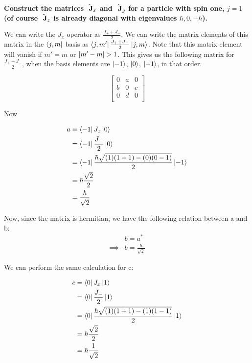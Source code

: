 \question


\begin{alphaparts}
    
\questionpart
\textbf{Construct the matrices $\hat{\textbf{~J}}_x$ and $\hat{\textbf{~J}}_y$ for a particle with 
spin one, $j = 1$ (of course $\hat{\textbf{~J}}_z$ is already diagonal with eigenvalues $\hbar, 0, -\hbar$).} 

We can write the $J_x$ operator as $\frac{J_+ + J_-}{2}$. We can write the matrix elements of this matrix in the $\bra{j,m}$ basis as $\bra{j,m'} \frac{J_+ + J_-}{2} \ket{j,m}$. Note that this matrix element will vanish if $m' = m$ or $\abs{m' - m} > 1$. This gives us the following matrix for $\frac{J_+ + J_-}{2}$, when the basis elements are $\ket{-1}$, $\ket{0}$, $\ket{+1}$, in that order.

\begin{equation}
    \begin{bmatrix}
    0 & a & 0 \\
    b & 0 & c \\
    0 & d & 0 \\
    \end{bmatrix}
\end{equation}

Now

\begin{equation}
    \begin{split}
        a &= \bra{-1} J_x \ket{0} \\
        &= \bra{-1} \frac{J_-}{2} \ket{0} \\ 
        &= \bra{-1} \frac{\hbar \sqrt{(1)(1+1) - (0)(0 - 1)}}{2} \ket{-1}\\
        &= \hbar \frac{\sqrt{2}}{2} \\
        &= \frac{\hbar}{\sqrt{2}}
    \end{split}
\end{equation}

Now, since the matrix is hermitian, we have the following relation between a and b:
\begin{equation}
\begin{split}
    & b = a^* \\
    \implies & b = \frac{\hbar}{\sqrt{2}}
\end{split}
\end{equation}

We can perform the same calculation for c:

\begin{equation}
    \begin{split}
        c &= \bra{0} J_x \ket{1} \\
        &= \bra{0} \frac{J_-}{2} \ket{1} \\ 
        &= \bra{0} \frac{\hbar \sqrt{(1)(1+1) - (1)(1 - 1)}}{2} \ket{1}\\
        &= \hbar \frac{\sqrt{2}}{2} \\
        &= \hbar \frac{1}{\sqrt{2}}
    \end{split}
\end{equation}


\end{alphaparts}
